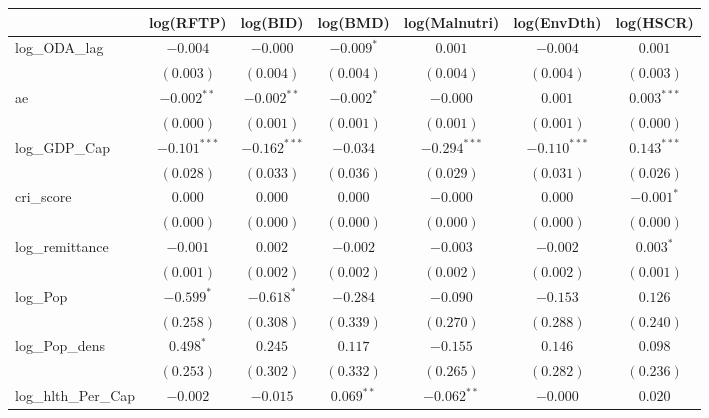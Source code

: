 \begin{table}
\begin{center}
\begin{tabular}{l c c c c c c}
\hline
 & log(RFTP) & log(BID) & log(BMD) & log(Malnutri) & log(EnvDth) & log(HSCR) \\
\hline
log\_ODA\_lag       & $-0.004$       & $-0.000$       & $-0.009^{*}$  & $0.001$        & $-0.004$       & $0.001$       \\
                    & $(0.003)$      & $(0.004)$      & $(0.004)$     & $(0.004)$      & $(0.004)$      & $(0.003)$     \\
ae                  & $-0.002^{**}$  & $-0.002^{**}$  & $-0.002^{*}$  & $-0.000$       & $0.001$        & $0.003^{***}$ \\
                    & $(0.000)$      & $(0.001)$      & $(0.001)$     & $(0.001)$      & $(0.001)$      & $(0.000)$     \\
log\_GDP\_Cap       & $-0.101^{***}$ & $-0.162^{***}$ & $-0.034$      & $-0.294^{***}$ & $-0.110^{***}$ & $0.143^{***}$ \\
                    & $(0.028)$      & $(0.033)$      & $(0.036)$     & $(0.029)$      & $(0.031)$      & $(0.026)$     \\
cri\_score          & $0.000$        & $0.000$        & $0.000$       & $-0.000$       & $0.000$        & $-0.001^{*}$  \\
                    & $(0.000)$      & $(0.000)$      & $(0.000)$     & $(0.000)$      & $(0.000)$      & $(0.000)$     \\
log\_remittance     & $-0.001$       & $0.002$        & $-0.002$      & $-0.003$       & $-0.002$       & $0.003^{*}$   \\
                    & $(0.001)$      & $(0.002)$      & $(0.002)$     & $(0.002)$      & $(0.002)$      & $(0.001)$     \\
log\_Pop            & $-0.599^{*}$   & $-0.618^{*}$   & $-0.284$      & $-0.090$       & $-0.153$       & $0.126$       \\
                    & $(0.258)$      & $(0.308)$      & $(0.339)$     & $(0.270)$      & $(0.288)$      & $(0.240)$     \\
log\_Pop\_dens      & $0.498^{*}$    & $0.245$        & $0.117$       & $-0.155$       & $0.146$        & $0.098$       \\
                    & $(0.253)$      & $(0.302)$      & $(0.332)$     & $(0.265)$      & $(0.282)$      & $(0.236)$     \\
log\_hlth\_Per\_Cap & $-0.002$       & $-0.015$       & $0.069^{**}$  & $-0.062^{**}$  & $-0.000$       & $0.020$       \\

\end{tabular}
\end{center}
\end{table}
